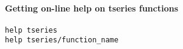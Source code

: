 \paragraph{Getting on-line help on tseries
functions}

\begin{verbatim}
help tseries
help tseries/function_name
\end{verbatim}



